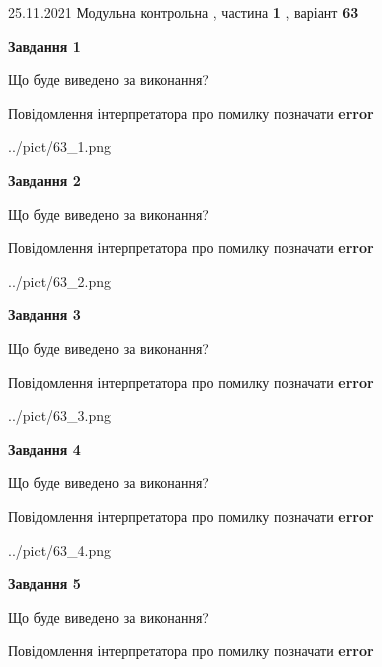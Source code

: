 \documentclass[10pt, ukrainian]{article}
\begin{document}
{25.11.2021 Модульна контрольна , частина \textbf { 1 }, варіант  \No \textbf { 63 }\par}
{
\begin {large}

{\begin {center}\textbf{Завдання 1}\end {center}}\par
Що буде виведено за виконання? \par
Повідомлення інтерпретатора про помилку позначати \textbf{error}

\begin{center}
	{../pict/63_1.png}
\end{center}
\newpage

{\begin {center}\textbf{Завдання 2}\end {center}}\par
Що буде виведено за виконання? \par
Повідомлення інтерпретатора про помилку позначати \textbf{error}

\begin{center}
	{../pict/63_2.png}
\end{center}
\newpage

{\begin {center}\textbf{Завдання 3}\end {center}}\par
Що буде виведено за виконання? \par
Повідомлення інтерпретатора про помилку позначати \textbf{error}

\begin{center}
	{../pict/63_3.png}
\end{center}
\newpage

{\begin {center}\textbf{Завдання 4}\end {center}}\par
Що буде виведено за виконання? \par
Повідомлення інтерпретатора про помилку позначати \textbf{error}

\begin{center}
	{../pict/63_4.png}
\end{center}
\newpage

{\begin {center}\textbf{Завдання 5}\end {center}}\par
Що буде виведено за виконання? \par
Повідомлення інтерпретатора про помилку позначати \textbf{error}


\end{large}}
\end{document}
